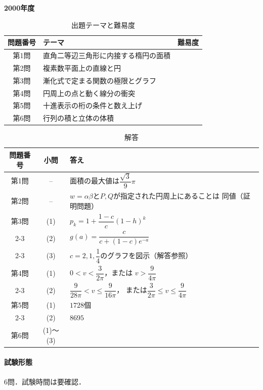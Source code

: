 \documentclass[../../main.tex]{subfiles}
\begin{document}
\begin{center}
  {\fontsize{48pt}{58pt}\selectfont \textbf{2000}\normalsize\textbf{年度}}
\end{center}

\begin{table}[htb]
  \centering
  \caption{出題テーマと難易度}
  \begin{tabular}{|c|p{9cm}|c|}
    \hline
    \textbf{問題番号} & \textbf{テーマ} & \textbf{難易度} \\
    \hline
    第1問 & 直角二等辺三角形に内接する楕円の面積 & \\
    \hline
    第2問 & 複素数平面上の直線と円 & \\
    \hline
    第3問 & 漸化式で定まる関数の極限とグラフ & \\
    \hline
    第4問 & 円周上の点と動く線分の衝突 & \\
    \hline
    第5問 & 十進表示の桁の条件と数え上げ & \\
    \hline
    第6問 & 行列の積と立体の体積 & \\
    \hline
  \end{tabular}
\end{table}

\begin{table}[htb]
  \centering
  \caption{解答}
  \renewcommand{\arraystretch}{1.4}
  \begin{tabular}{|c|c|p{9cm}|}
    \hline
    \textbf{問題番号} & \textbf{小問} & \textbf{答え} \\
    \hline
    第1問 & -- & 面積の最大値は$\dfrac{\sqrt{3}}{9}\pi$ \\
    \hline
    第2問 & -- & $w=\alpha\beta$と$P,Q$が指定された円周上にあることは
    同値（証明問題） \\
    \hline
    第3問 & (1) & $p_k=1+\dfrac{1-c}{c}(1-h)^k$ \\
    \cline{2-3}
    & (2) & $g(a)=\dfrac{c}{c+(1-c)e^{-a}}$ \\
    \cline{2-3}
    & (3) & $c=2,1,\dfrac{1}{4}$のグラフを図示（解答参照） \\
    \hline
    第4問 & (1) & $0<v<\dfrac{3}{2\pi}$，または
    $v>\dfrac{9}{4\pi}$ \\
    \cline{2-3}
    & (2) & $\dfrac{9}{28\pi}<v\le\dfrac{9}{16\pi}$，
    または$\dfrac{3}{2\pi}\le v\le\dfrac{9}{4\pi}$ \\
    \hline
    第5問 & (1) & $1728$個 \\
    \cline{2-3}
    & (2) & $8695$ \\
    \hline
    第6問 & (1)〜(3) & \\
    \hline
  \end{tabular}
\end{table}

\paragraph{試験形態}
6問．試験時間は要確認．
\end{document}
